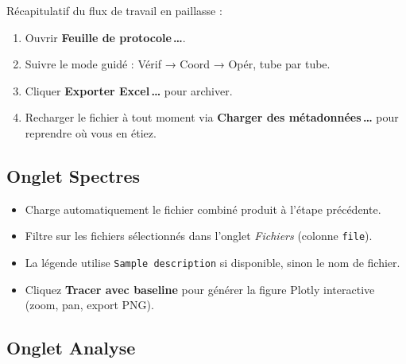 \documentclass[12pt, a4paper]{article}
\begin{document}
\begin{remarque}
Récapitulatif du flux de travail en paillasse :
\begin{enumerate}
  \item Ouvrir \textbf{Feuille de protocole\,\ldots}.
  \item Suivre le mode guidé : Vérif → Coord → Opér, tube par tube.
  \item Cliquer \textbf{Exporter Excel\,\ldots} pour archiver.
  \item Recharger le fichier à tout moment via
        \textbf{Charger des métadonnées\,\ldots} pour reprendre où vous en
        étiez.
\end{enumerate}
\end{remarque}

\subsection{Onglet Spectres}

\begin{itemize}
  \item Charge automatiquement le fichier combiné produit à l'étape précédente.
  \item Filtre sur les fichiers sélectionnés dans l'onglet \textit{Fichiers}
        (colonne \texttt{file}).
  \item La légende utilise \texttt{Sample description} si disponible, sinon le
        nom de fichier.
  \item Cliquez \textbf{Tracer avec baseline} pour générer la figure Plotly
        interactive (zoom, pan, export PNG).
\end{itemize}

\subsection{Onglet Analyse}
\end{document}
